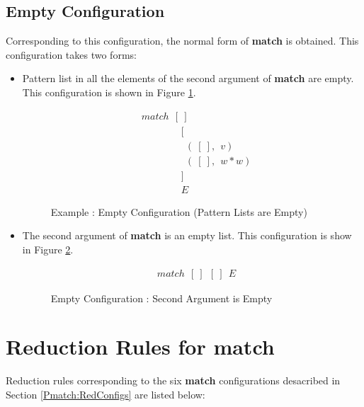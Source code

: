 \documentclass[11pt]{article}
\begin{document}
\subsection{Empty Configuration}
Corresponding to this configuration, the normal form of {\bf match} is obtained. This configuration takes two forms:
\begin{itemize}
  \item Pattern list in all the elements of the second argument of {\bf match} are empty. This configuration is shown in Figure \ref {fig:Pmatch_EmptyPatt}.
    \begin{figure}[!h]
    \begin{align*} 
    &match~~[~] \\
    &\qquad\qquad [\\
    &\qquad\qquad ~~(~[~],~~v) \\
    &\qquad\qquad ~~(~[~],~~w*w) \\
    &\qquad\qquad ]\\
    &\qquad\qquad E
    \end{align*} 
    \caption{Example : Empty Configuration (Pattern Lists are Empty)} \label{fig:Pmatch_EmptyPatt}
    \end{figure}
  \item The second argument of {\bf match} is an empty list. This configuration is show in Figure \ref {fig:Pmatch_EmptySArgs}.
    \begin{figure}[!h]
    \begin{align*} 
    &match~~[~]~~[~]~~E 
    \end{align*} 
    \caption{Empty Configuration : Second Argument is Empty} \label{fig:Pmatch_EmptySArgs}
    \end{figure}
\end{itemize}


\section{Reduction Rules for match}\label{Pmatch:redRule}
Reduction rules corresponding to the six {\bf match} configurations desacribed in Section \ref {Pmatch:RedConfigs}  are listed below:
\end{document}
